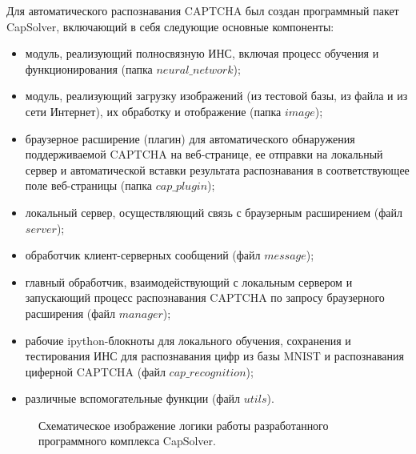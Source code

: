 \documentclass[a4paper,12pt,russian]{article} %
\begin{document}
Для автоматического распознавания CAPTCHA был создан программный пакет CapSolver, включающий в себя следующие основные компоненты:
\begin{itemize}
	\item модуль, реализующий полносвязную ИНС, включая процесс обучения и функционирования (папка $neural\_network$);
	\item модуль, реализующий загрузку изображений (из тестовой базы, из файла и из сети Интернет), их обработку и отображение (папка $image$);
	\item браузерное расширение (плагин) для автоматического обнаружения поддерживаемой CAPTCHA на веб-странице, ее отправки на локальный сервер и автоматической вставки результата распознавания в соответствующее поле веб-страницы (папка $cap\_plugin$);
	\item локальный сервер, осуществляющий связь с браузерным расширением (файл $server$);
	\item обработчик клиент-серверных сообщений (файл $message$);
	\item главный обработчик, взаимодействующий с локальным сервером и запускающий процесс распознавания CAPTCHA по запросу браузерного расширения (файл $manager$);
	\item рабочие ipython-блокноты для локального обучения, сохранения и тестирования ИНС для распознавания цифр из базы MNIST и распознавания циферной CAPTCHA (файл $cap\_recognition$);
	\item различные вспомогательные функции (файл $utils$).
\end{itemize}

\begin{figure}[t!]
	\caption{
		Схематическое изображение логики работы разработанного программного комплекса CapSolver.
        }
        \label{fig:cap_solver}
\end{figure}
\end{document}
